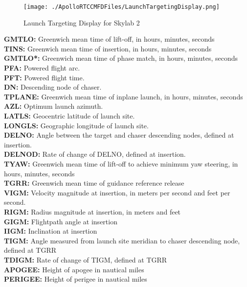 \documentclass[11pt]{article} %
\begin{document}
\begin{figure}[hp]
	\centering
		\texttt{[image: ./ApolloRTCCMFDFiles/LaunchTargetingDisplay.png]}
	\caption{Launch Targeting Display for Skylab 2}
	\label{fig:LaunchTargetingDisplayExample1}
\end{figure}

\textbf{GMTLO:} Greenwich mean time of lift-off, in hours, minutes, seconds\\
\textbf{TINS:} Greenwich mean time of insertion, in hours, minutes, seconds\\
\textbf{GMTLO*:} Greenwich mean time of phase match, in hours, minutes, seconds\\
\textbf{PFA:} Powered flight arc.\\
\textbf{PFT:} Powered flight time.\\
\textbf{DN:} Descending node of chaser.\\
\textbf{TPLANE:} Greenwich mean time of inplane launch, in hours, minutes, seconds\\
\textbf{AZL:} Optimum launch azimuth.\\
\textbf{LATLS:} Geocentric latitude of launch site.\\
\textbf{LONGLS:} Geographic longitude of launch site.\\
\textbf{DELNO:} Angle between the target and chaser descending nodes, defined at insertion.\\
\textbf{DELNOD:} Rate of change of DELNO, defined at insertion.\\
\textbf{TYAW:} Greenwich mean time of lift-off to achieve minimum yaw steering, in hours, minutes, seconds\\
\textbf{TGRR:} Greenwich mean time of guidance reference release\\
\textbf{VIGM:} Velocity magnitude at insertion, in meters per second and feet per second.\\
\textbf{RIGM:} Radius magnitude at insertion, in meters and feet\\
\textbf{GIGM:} Flightpath angle at insertion\\
\textbf{IIGM:} Inclination at insertion\\
\textbf{TIGM:} Angle measured from launch site meridian to chaser descending node, defined at TGRR\\
\textbf{TDIGM:} Rate of change of TIGM, defined at TGRR\\
\textbf{APOGEE:} Height of apogee in nautical miles\\
\textbf{PERIGEE:} Height of perigee in nautical miles\\
\end{document}
